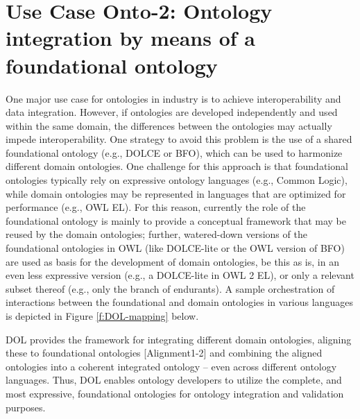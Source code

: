 \documentclass[10pt,%
\ifpretendfinal
final%
\else
draft%
\fi,
]{scrreprt}
\begin{document}
\section{Use Case Onto-2: Ontology integration by means of a foundational ontology}
One major use case for ontologies in industry is to achieve interoperability and data integration. However, if ontologies are developed independently and used 
within the same domain, the differences between the ontologies may actually impede interoperability. One strategy to avoid this problem is the use of a shared 
foundational ontology (e.g., DOLCE or BFO), which can be used to harmonize different domain ontologies. One challenge for this approach is that foundational 
ontologies typically rely on expressive ontology languages (e.g., Common Logic), while domain ontologies may be represented in languages that are optimized for 
performance (e.g., OWL EL). For this reason, currently the role of the foundational ontology is mainly to provide a conceptual framework that may be reused by the 
domain ontologies; further, watered-down versions of the foundational ontologies in OWL (like DOLCE-lite or the OWL version of BFO) are used as basis for the 
development of domain ontologies, be this as is, in an even less expressive version (e.g., a DOLCE-lite in OWL 2 EL), or only a relevant subset thereof (e.g., only 
the branch of endurants). A sample orchestration of interactions between the foundational and domain ontologies in various languages is depicted in Figure \ref{f:DOL-mapping} below.

DOL  provides the framework for integrating different domain ontologies, aligning these to foundational ontologies [Alignment1-2] and 
combining the aligned ontologies into a coherent integrated ontology -- even across different ontology languages. Thus, DOL  enables 
ontology developers to utilize the complete, and most expressive, foundational ontologies for ontology integration and validation purposes. 


 
\end{document}
